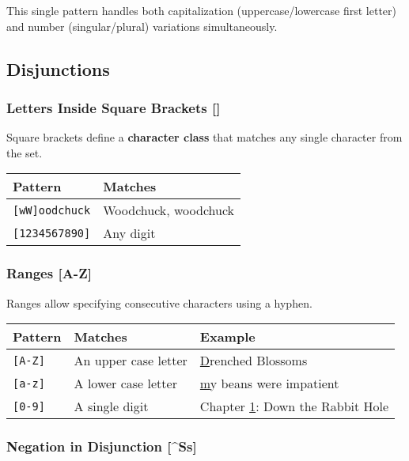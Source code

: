 \documentclass[11pt,a4paper]{article}
\theoremstyle{definition}
\theoremstyle{plain}
\theoremstyle{remark}
\begin{document}
This single pattern handles both capitalization (uppercase/lowercase first letter) and number (singular/plural) variations simultaneously.

\subsection{Disjunctions}

\subsubsection{Letters Inside Square Brackets []}

Square brackets define a \textbf{character class} that matches any single character from the set.

\begin{table}[h]
\centering
\begin{tabular}{|l|l|}
\hline
\textbf{Pattern} & \textbf{Matches} \\
\hline
\texttt{[wW]oodchuck} & Woodchuck, woodchuck \\
\hline
\texttt{[1234567890]} & Any digit \\
\hline
\end{tabular}
\end{table}

\subsubsection{Ranges [A-Z]}

Ranges allow specifying consecutive characters using a hyphen.

\begin{table}[h]
\centering
\begin{tabular}{|l|l|l|}
\hline
\textbf{Pattern} & \textbf{Matches} & \textbf{Example} \\
\hline
\texttt{[A-Z]} & An upper case letter & \underline{D}renched Blossoms \\
\hline
\texttt{[a-z]} & A lower case letter & \underline{m}y beans were impatient \\
\hline
\texttt{[0-9]} & A single digit & Chapter \underline{1}: Down the Rabbit Hole \\
\hline
\end{tabular}
\end{table}

\newpage
\subsubsection{Negation in Disjunction [\^{}Ss]}
\end{document}
